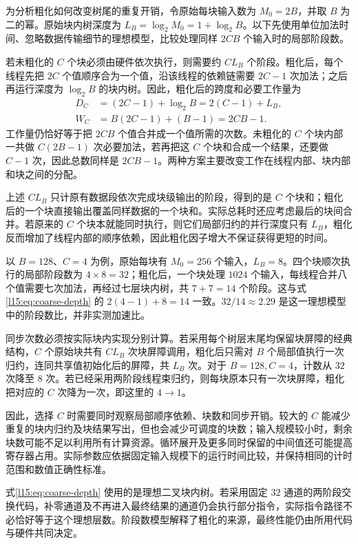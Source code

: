 为分析粗化如何改变树尾的重复开销，令原始每块输入数为 $M_0=2B$，并取 $B$ 为二的幂。原始块内树深度为 $L_B=\log_2M_0=1+\log_2B$。以下先使用单位加法时间、忽略数据传输细节的理想模型，比较处理同样 $2CB$ 个输入时的局部阶段数。

若未粗化的 $C$ 个块必须由硬件依次执行，则需要约 $CL_B$ 个阶段。粗化后，每个线程先把 $2C$ 个值顺序合为一个值，沿该线程的依赖链需要 $2C-1$ 次加法；之后再运行深度为 $\log_2B$ 的块内树。因此，粗化后的跨度和必要工作量为
\begin{align}
D_C&=(2C-1)+\log_2B=2(C-1)+L_B,
\label{l15:eq:coarse-depth}\\
W_C&=B(2C-1)+(B-1)=2CB-1.
\label{l15:eq:coarse-work}
\end{align}
工作量仍恰好等于把 $2CB$ 个值合并成一个值所需的次数。未粗化的 $C$ 个块内部一共做 $C(2B-1)$ 次必要加法，若再把这 $C$ 个块和合成一个结果，还要做 $C-1$ 次，因此总数同样是 $2CB-1$。两种方案主要改变工作在线程内部、块内部和块之间的分配。

上述 $CL_B$ 只计原有数据段依次完成块级输出的阶段，得到的是 $C$ 个块和；粗化后的一个块直接输出覆盖同样数据的一个块和。实际总耗时还应考虑最后的块间合并。若原来的 $C$ 个块本就能同时执行，则它们局部归约的并行深度只有 $L_B$，粗化反而增加了线程内部的顺序依赖，因此粗化因子增大不保证获得更短的时间。

以 $B=128$、$C=4$ 为例，原始每块有 $M_0=256$ 个输入，$L_B=8$。四个块顺次执行的局部阶段数为 $4\times8=32$；粗化后，一个块处理 $1024$ 个输入，每线程合并八个值需要七次加法，再经过七层块内树，共 $7+7=14$ 个阶段。这与式\eqref{l15:eq:coarse-depth} 的 $2(4-1)+8=14$ 一致。$32/14\approx2.29$ 是这一理想模型中的阶段数比，并非实测加速比。

同步次数必须按实际块内实现分别计算。若采用每个树层末尾均保留块屏障的经典结构，$C$ 个原始块共有 $CL_B$ 次块屏障调用，粗化后只需对 $B$ 个局部值执行一次归约，连同共享值初始化后的屏障，共 $L_B$ 次。对于 $B=128,C=4$，计数从 $32$ 次降至 $8$ 次。若已经采用两阶段线程束归约，则每块原本只有一次块屏障，粗化把对应的 $C$ 次降为一次，即这里的 $4\to1$。

因此，选择 $C$ 时需要同时观察局部顺序依赖、块数和同步开销。较大的 $C$ 能减少重复的块内归约及块结果写出，但也会减少可调度的块数；输入规模较小时，剩余块数可能不足以利用所有计算资源。循环展开及更多同时保留的中间值还可能提高寄存器占用。实际参数应依据固定输入规模下的运行时间比较，并保持相同的计时范围和数值正确性标准。

式\eqref{l15:eq:coarse-depth} 使用的是理想二叉块内树。若采用固定 $32$ 通道的两阶段交换代码，补零通道及不再进入最终结果的通道仍会执行部分指令，实际指令路径不必恰好等于这个理想层数。阶段数模型解释了粗化的来源，最终性能仍由所用代码与硬件共同决定。

